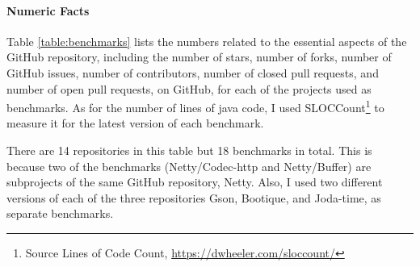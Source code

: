 \paragraph{Numeric Facts}

Table \ref{table:benchmarks} lists the numbers related to the essential aspects of the GitHub repository, including the number of stars, number of forks, number of GitHub issues, number of contributors, number of closed pull requests, and number of open pull requests, on GitHub, for each of the projects used as benchmarks. As for the number of lines of java code, I used SLOCCount\footnote{Source Lines of Code Count, \url{https://dwheeler.com/sloccount/}} to measure it for the latest version of each benchmark.

There are 14 repositories in this table but 18 benchmarks in total. This is because two of the benchmarks (Netty/Codec-http and Netty/Buffer) are subprojects of the same GitHub repository, Netty. Also, I used two different versions of each of the three repositories Gson, Bootique, and Joda-time, as separate benchmarks.


\begin{table}[h!]
\centering
{}
\caption{Numeric Characteristics of Benchmarks}
\label{table:benchmarks}
\end{table}

